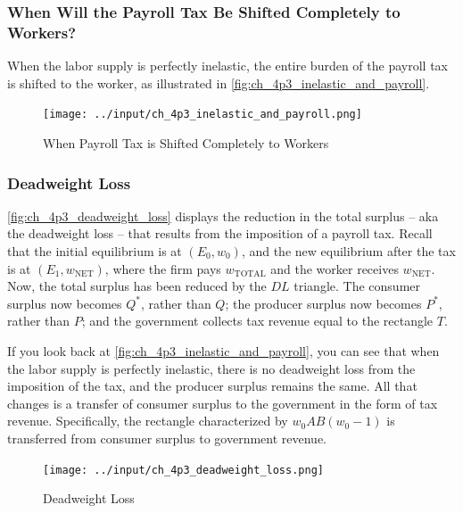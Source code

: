 \FloatBarrier


\subsubsection{When Will the Payroll Tax Be Shifted Completely to Workers?}

When the labor supply is perfectly inelastic,
the entire burden of the payroll tax is shifted to the worker,
as illustrated in \autoref{fig:ch_4p3_inelastic_and_payroll}.

\FloatBarrier

\begin{figure}[!htb]
    \centering
        \texttt{[image: ../input/ch\_4p3\_inelastic\_and\_payroll.png]}
    \caption{When Payroll Tax is Shifted Completely to Workers}
    \label{fig:ch_4p3_inelastic_and_payroll}
\end{figure}

\FloatBarrier


\subsubsection{Deadweight Loss}

\autoref{fig:ch_4p3_deadweight_loss}
displays the reduction in the total surplus -- aka the deadweight loss --
that results from the imposition of a payroll tax.
Recall that the initial equilibrium is at $(E_0, w_0)$,
and the new equilibrium after the tax is at $(E_1, w_{\text{NET}})$,
where the firm pays $w_{\text{TOTAL}}$ and the worker receives $w_{\text{NET}}$.
Now, the total surplus has been reduced by the $DL$ triangle.
The consumer surplus now becomes
$Q^*$, rather than $Q$; the producer surplus now 
becomes $P^*$, rather than $P$; and the government
collects tax revenue equal to the rectangle $T$.

If you look back at \autoref{fig:ch_4p3_inelastic_and_payroll},
you can see that when the labor supply is perfectly inelastic,
there is no deadweight loss from the imposition of the tax,
and the producer surplus remains the same. 
All that changes is a transfer of consumer surplus to 
the government in the form of tax revenue. Specifically,
the rectangle characterized by $w_0AB(w_0 - 1)$
is transferred from consumer surplus to government revenue.


\FloatBarrier

\begin{figure}[!htb]
    \centering
        \texttt{[image: ../input/ch\_4p3\_deadweight\_loss.png]}
    \caption{Deadweight Loss}
    \label{fig:ch_4p3_deadweight_loss}
\end{figure}

\FloatBarrier